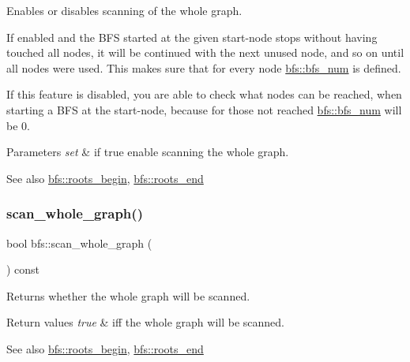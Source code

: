 Enables or disables scanning of the whole graph. 

If enabled and the B\+FS started at the given start-\/node stops without having touched all nodes, it will be continued with the next unused node, and so on until all nodes were used. This makes sure that for every node \mbox{\hyperlink{classbfs_a6205cc191bc0bedf1ff9d74af0925735}{bfs\+::bfs\+\_\+num}} is defined.

If this feature is disabled, you are able to check what nodes can be reached, when starting a B\+FS at the start-\/node, because for those not reached \mbox{\hyperlink{classbfs_a6205cc191bc0bedf1ff9d74af0925735}{bfs\+::bfs\+\_\+num}} will be 0.


\begin{DoxyParams}{Parameters}
{\em set} & if true enable scanning the whole graph. \\
\hline
\end{DoxyParams}
\begin{DoxySeeAlso}{See also}
\mbox{\hyperlink{classbfs_a45d58d06d0dcd6427edad2ec52a6ebb9}{bfs\+::roots\+\_\+begin}}, \mbox{\hyperlink{classbfs_ac84b90f777adeb90390689db62602d73}{bfs\+::roots\+\_\+end}} 
\end{DoxySeeAlso}
\mbox{\label{classbfs_a1378f5cfbc59b036e9215c02563bac23}} 
\subsubsection{\texorpdfstring{scan\+\_\+whole\+\_\+graph()}{scan\_whole\_graph()}\hspace{0.1cm}{\footnotesize\ttfamily [2/2]}}
{\footnotesize\ttfamily bool bfs\+::scan\+\_\+whole\+\_\+graph (\begin{DoxyParamCaption}{ }\end{DoxyParamCaption}) const\hspace{0.3cm}{\ttfamily [inline]}}



Returns whether the whole graph will be scanned. 


\begin{DoxyRetVals}{Return values}
{\em true} & iff the whole graph will be scanned. \\
\hline
\end{DoxyRetVals}
\begin{DoxySeeAlso}{See also}
\mbox{\hyperlink{classbfs_a45d58d06d0dcd6427edad2ec52a6ebb9}{bfs\+::roots\+\_\+begin}}, \mbox{\hyperlink{classbfs_ac84b90f777adeb90390689db62602d73}{bfs\+::roots\+\_\+end}} 
\end{DoxySeeAlso}
\mbox{\label{classbfs_a23e2981c2ee617a6e12a8833d2db6210}} 
